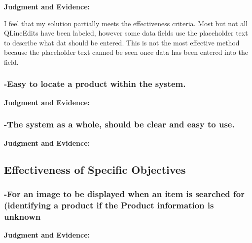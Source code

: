 \textbf{Judgment and Evidence:} \newline

I feel that my solution partially meets the effectiveness criteria. Most but not all QLineEdits have been labeled, however some data fields use the placeholder text to describe what dat should be entered. This is not the most effective method because the placeholder text canned be seen once data has been entered into the field.







\subsubsection{-Easy to locate a product within the system.}

\textbf{Judgment and Evidence:} \newline







\subsubsection{-The system as a whole, should be clear and easy to use.}

\textbf{Judgment and Evidence:} \newline









\subsection{Effectiveness of Specific Objectives}



\subsubsection{-For an image to be displayed when an item is searched for (identifying a product if the Product information is unknown}


\textbf{Judgment and Evidence:} \newline








